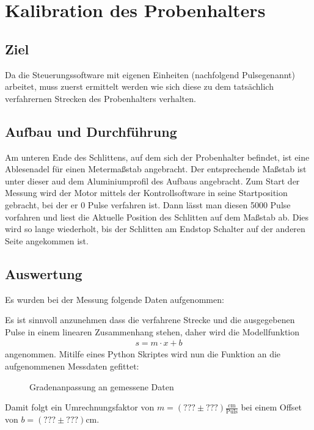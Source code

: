 \documentclass[12pt,twoside,a4paper]{scrartcl}
\begin{document}
	\section{Kalibration des Probenhalters}

		\subsection{Ziel}
			Da die Steuerungssoftware mit eigenen Einheiten (nachfolgend \glqq Pulse\grqq genannt) arbeitet, muss zuerst ermittelt werden wie sich diese zu dem tatsächlich verfahrernen Strecken des Probenhalters verhalten.

		\subsection{Aufbau und Durchführung}
			Am unteren Ende des Schlittens, auf dem sich der Probenhalter befindet, ist eine Ablesenadel für einen Metermaßstab angebracht. Der entsprechende Maßstab ist unter dieser aud dem Aluminiumprofil des Aufbaus angebracht. Zum Start der Messung wird der Motor mittels der Kontrollsoftware in seine Startposition gebracht, bei der er 0 Pulse verfahren ist. Dann lässt man diesen 5000 Pulse vorfahren und liest die Aktuelle Position des Schlitten auf dem Maßstab ab. Dies wird so lange wiederholt, bis der Schlitten am Endstop Schalter auf der anderen Seite angekommen ist.

		\subsection{Auswertung}

			Es wurden bei der Messung folgende Daten aufgenommen:

				


			Es ist sinnvoll anzunehmen dass die verfahrene Strecke und die ausgegebenen Pulse in einem linearen Zusammenhang stehen, daher wird die Modellfunktion
			\begin{align*}
					s = m \cdot x + b
			\end{align*}
			angenommen.
			Mitilfe eines Python Skriptes wird nun die Funktion an die aufgenommenen Messdaten gefittet:

			\begin{figure}[H]
				\centering
				\caption{Gradenanpassung an gemessene Daten}
			\end{figure}

				Damit folgt ein Umrechnungsfaktor von $m = (??? \pm ???) \frac{\si{\centi \metre}}{\text{Puls}}$ bei einem Offset von $b = (??? \pm ???) \si{\centi \metre}$.
\end{document}
